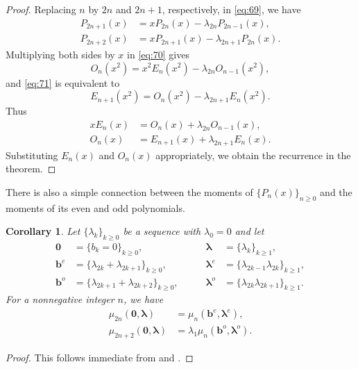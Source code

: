 \documentclass[oneside]{book}
\numberwithin{equation}{section}
\newtheorem{cor}[thm]{Corollary}
\theoremstyle{definition}
\renewcommand\vec[1]{\bm{#1}}
\newcommand\vb{\vec{b}}
\newcommand\vla{\vec{\lambda}}
\begin{document}
\begin{proof}
  Replacing \( n \) by \( 2n \) and \( 2n+1 \), respectively, in
  \eqref{eq:69}, we have
  \begin{align}
\label{eq:70}    P_{2n+1}(x) &= x P_{2n}(x) - \lambda_{2n} P_{2n-1}(x),\\
\label{eq:71}    P_{2n+2}(x) &= x P_{2n+1}(x) - \lambda_{2n+1} P_{2n}(x).
  \end{align}
  Multiplying both sides by \( x \) in \eqref{eq:70} gives
  \[
    O_n(x^2) = x^2 E_{n}(x^2) - \lambda_{2n} O_{n-1}(x^2),
  \]
  and \eqref{eq:71} is equivalent to
  \[
    E_{n+1}(x^2) = O_{n}(x^2) - \lambda_{2n+1} E_{n}(x^2).
  \]
  Thus
  \begin{align*}
  xE_n(x)  &= O_n(x) + \lambda_{2n} O_{n-1}(x),\\
  O_n(x)  &= E_{n+1}(x) + \lambda_{2n+1}E_n(x).
  \end{align*}
  Substituting \( E_n(x) \) and \( O_n(x) \) appropriately, we obtain
  the recurrence in the theorem.
\end{proof}


There is also a simple connection between the moments of
\( \{ P_n(x) \}_{n\ge 0} \) and the moments of its even and odd
polynomials.


\begin{cor}\label{cor:7}
  Let \( \{\lambda_k\}_{k\ge0} \) be a sequence with
  \( \lambda_0=0 \) and let
\[
    \begin{aligned}
    \vec 0 &= \{b_k=0\}_{k\ge0},\\
    \vb^e &= \{\lambda_{2k}+\lambda_{2k+1}\}_{k\ge 0},\\
    \vb^o &=\{\lambda_{2k+1}+\lambda_{2k+2}\}_{k\ge 0},
  \end{aligned}
  \qquad
    \begin{aligned}
    \vla &= \{\lambda_k\}_{k\ge1},\\
    \vla^e &= \{\lambda_{2k-1}\lambda_{2k}\}_{k\ge1},\\
    \vla^o &= \{\lambda_{2k}\lambda_{2k+1}\}_{k\ge1}.
  \end{aligned}
\]
  For a nonnegative integer \( n \), we have
\begin{align*}
 \mu_{2n}(\vec 0,\vla) &= \mu_n(\vb^e, \vla^e), \\
 \mu_{2n+2}(\vec 0,\vla) &= \lambda_1 \mu_n(\vb^o, \vla^o).
\end{align*}
\end{cor}
\begin{proof}
This follows immediate from   and .
\end{proof}
\end{document}
